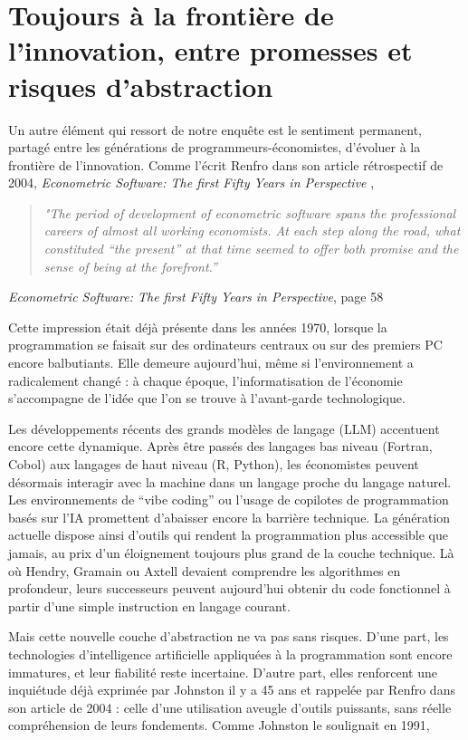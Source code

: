 \section{Toujours à la frontière de l'innovation, entre promesses et risques d’abstraction}


Un autre élément qui ressort de notre enquête est le sentiment permanent, partagé entre les générations de programmeurs-économistes, d’évoluer à la frontière de l’innovation. Comme l’écrit Renfro dans son article rétrospectif de 2004, \textit{Econometric Software: The first Fifty Years in Perspective} \cite{renfroEconometricSoftwareFirst2004}, 

\begin{quote}
\begin{center}
\textit{"The period of development of econometric software spans the professional careers of almost all working economists. At each step along the road, what constituted “the present” at that time seemed to offer both promise and the sense of being at the forefront.”}
\end{center}
\end{quote} \hfill \textit{Econometric Software: The first Fifty Years in Perspective}, page 58 \cite{renfroEconometricSoftwareFirst2004}

 
Cette impression était déjà présente dans les années 1970, lorsque la programmation se faisait sur des ordinateurs centraux ou sur des premiers PC encore balbutiants. Elle demeure aujourd’hui, même si l’environnement a radicalement changé : à chaque époque, l’informatisation de l’économie s’accompagne de l’idée que l’on se trouve à l’avant-garde technologique.

Les développements récents des grands modèles de langage (LLM) accentuent encore cette dynamique. Après être passés des langages bas niveau (Fortran, Cobol) aux langages de haut niveau (R, Python), les économistes peuvent désormais interagir avec la machine dans un langage proche du langage naturel. Les environnements de “vibe coding” ou l’usage de copilotes de programmation basés sur l’IA promettent d’abaisser encore la barrière technique. La génération actuelle dispose ainsi d’outils qui rendent la programmation plus accessible que jamais, au prix d’un éloignement toujours plus grand de la couche technique. Là où Hendry, Gramain ou Axtell devaient comprendre les algorithmes en profondeur, leurs successeurs peuvent aujourd’hui obtenir du code fonctionnel à partir d’une simple instruction en langage courant.

Mais cette nouvelle couche d’abstraction ne va pas sans risques. D’une part, les technologies d’intelligence artificielle appliquées à la programmation sont encore immatures, et leur fiabilité reste incertaine. D’autre part, elles renforcent une inquiétude déjà exprimée par Johnston il y a 45 ans et rappelée par Renfro dans son article de 2004 : celle d’une utilisation aveugle d’outils puissants, sans réelle compréhension de leurs fondements. Comme Johnston le soulignait en 1991, 


